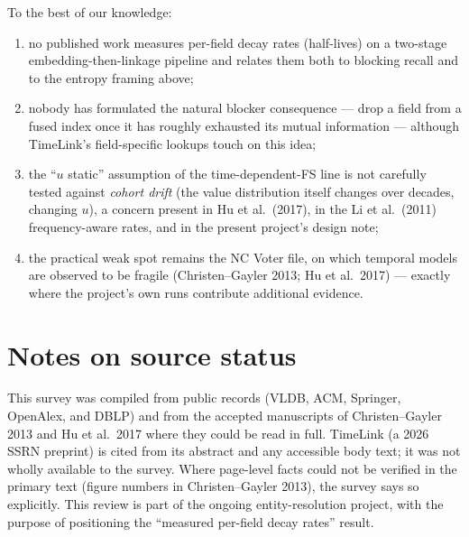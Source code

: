 \documentclass[11pt]{article}
\begin{document}
To the best of our knowledge:
\begin{enumerate}
  \item no published work measures per-field decay rates (half-lives) on a two-stage
        embedding-then-linkage pipeline and relates them both to blocking recall and to
        the entropy framing above;
  \item nobody has formulated the natural blocker consequence --- drop a field from a
        fused index once it has roughly exhausted its mutual information --- although
        TimeLink's field-specific lookups touch on this idea;
  \item the ``$u$ static'' assumption of the time-dependent-FS line is not carefully
        tested against \emph{cohort drift} (the value distribution itself changes over
        decades, changing $u$), a concern present in Hu et al.\ (2017), in the Li et al.\
        (2011) frequency-aware rates, and in the present project's design note;
  \item the practical weak spot remains the NC Voter file, on which temporal models are
        observed to be fragile (Christen--Gayler 2013; Hu et al.\ 2017) --- exactly where
        the project's own runs contribute additional evidence.
\end{enumerate}

\section{Notes on source status}

This survey was compiled from public records (VLDB, ACM, Springer, OpenAlex, and DBLP) and
from the accepted manuscripts of Christen--Gayler 2013 and Hu et al.\ 2017 where they could
be read in full. TimeLink (a 2026 SSRN preprint) is cited from its abstract and any
accessible body text; it was not wholly available to the survey. Where page-level facts could
not be verified in the primary text (figure numbers in Christen--Gayler 2013), the survey
says so explicitly. This review is part of the ongoing entity-resolution project, with the
purpose of positioning the ``measured per-field decay rates'' result.
\end{document}
